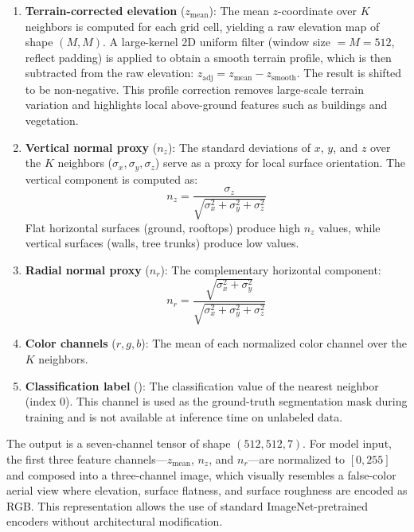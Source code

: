 \documentclass[11pt]{article}
\begin{document}
\begin{enumerate}
    \item \textbf{Terrain-corrected elevation} ($z_{\text{mean}}$): The mean $z$-coordinate over $K$ neighbors is computed for each grid cell, yielding a raw elevation map of shape $(M, M)$. A large-kernel 2D uniform filter (window size $= M = 512$, reflect padding) is applied to obtain a smooth terrain profile, which is then subtracted from the raw elevation: $z_{\text{adj}} = z_{\text{mean}} - z_{\text{smooth}}$. The result is shifted to be non-negative. This profile correction removes large-scale terrain variation and highlights local above-ground features such as buildings and vegetation.

    \item \textbf{Vertical normal proxy} ($n_z$): The standard deviations of $x$, $y$, and $z$ over the $K$ neighbors ($\sigma_x, \sigma_y, \sigma_z$) serve as a proxy for local surface orientation. The vertical component is computed as:
    \begin{equation}
        n_z = \frac{\sigma_z}{\sqrt{\sigma_x^2 + \sigma_y^2 + \sigma_z^2}}
    \end{equation}
    Flat horizontal surfaces (ground, rooftops) produce high $n_z$ values, while vertical surfaces (walls, tree trunks) produce low values.

    \item \textbf{Radial normal proxy} ($n_r$): The complementary horizontal component:
    \begin{equation}
        n_r = \frac{\sqrt{\sigma_x^2 + \sigma_y^2}}{\sqrt{\sigma_x^2 + \sigma_y^2 + \sigma_z^2}}
    \end{equation}

    \item \textbf{Color channels} ($r, g, b$): The mean of each normalized color channel over the $K$ neighbors.

    \item \textbf{Classification label} (): The classification value of the nearest neighbor (index 0). This channel is used as the ground-truth segmentation mask during training and is not available at inference time on unlabeled data.
\end{enumerate}

The output is a seven-channel tensor of shape $(512, 512, 7)$.
For model input, the first three feature channels---$z_{\text{mean}}$, $n_z$, and $n_r$---are normalized to $[0, 255]$ and composed into a three-channel image, which visually resembles a false-color aerial view where elevation, surface flatness, and surface roughness are encoded as RGB.
This representation allows the use of standard ImageNet-pretrained encoders without architectural modification.
\end{document}
